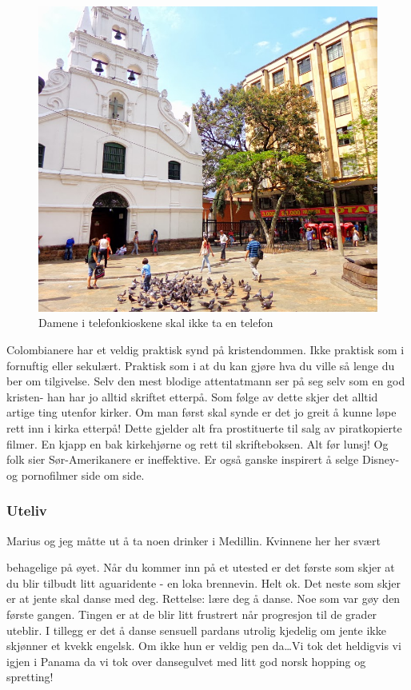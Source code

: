 \begin{figure}[!h]
	\centering
\includegraphics[width=\textwidth]{workinghard}
	\caption*{Damene i telefonkioskene skal ikke ta en telefon}
\label{fig:prosti}
\end{figure}
Colombianere har et veldig praktisk synd på kristendommen. Ikke
praktisk som i fornuftig eller sekulært. Praktisk som i at du kan gjøre
hva du ville så lenge du ber om tilgivelse. Selv den mest blodige
attentatmann ser på seg selv som en god kristen- han har jo
alltid skriftet etterpå. Som følge av dette skjer det alltid artige
ting utenfor kirker. Om man først skal synde er det jo greit å kunne
løpe rett inn i kirka etterpå! Dette gjelder alt fra prostituerte til
salg av  piratkopierte filmer. En kjapp en bak kirkehjørne og
rett til skrifteboksen. Alt før lunsj! Og folk sier Sør-Amerikanere er
ineffektive. Er også ganske inspirert å selge Disney- og pornofilmer
side om side.

\subsubsection{Uteliv}

Marius og jeg måtte ut å ta noen drinker i Medillin. Kvinnene her her svært

behagelige på øyet. Når du kommer inn på et utested er det første som skjer
at du blir tilbudt litt aguaridente - en loka brennevin. Helt ok. Det
neste som skjer er at jente skal danse med deg. Rettelse: lære deg å
danse. Noe som var gøy den første gangen. Tingen er at de blir litt
frustrert når progresjon til de grader uteblir. I tillegg er det
å danse sensuell pardans utrolig kjedelig om jente ikke skjønner et
kvekk engelsk. Om ikke hun er veldig pen da\ldots Vi tok det heldigvis vi igjen i Panama da vi tok over
dansegulvet med litt god norsk hopping og spretting!

